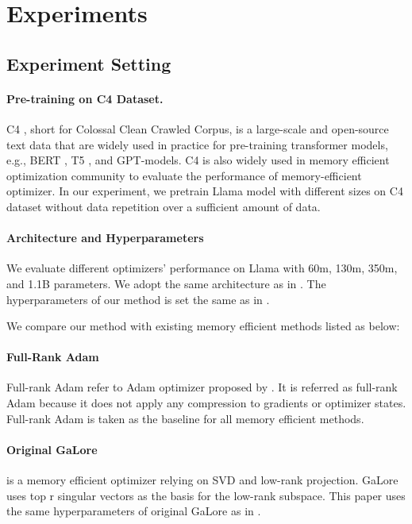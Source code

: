 \section{Experiments}
\subsection{Experiment Setting}
\paragraph{Pre-training on C4 Dataset.}
C4 \cite{raffel2020c4}, short for Colossal Clean Crawled Corpus, is a large-scale and open-source text data that are widely used in practice for pre-training transformer models, e.g., BERT \cite{portes2023mosaicbert}, T5 \cite{xue2020mt5}, and GPT-models. C4 is also widely used in memory efficient optimization community to evaluate the performance of memory-efficient optimizer\cite{hao2024flora, zhao2024galore, zhang2024q-galore, he2024subspace}. In our experiment, we pretrain Llama model with different sizes on C4 dataset without data repetition over a sufficient amount of data\cite{hoffmann2022scalinglaw}. 

\paragraph{Architecture and Hyperparameters} 
We evaluate different optimizers' performance on Llama with 60m, 130m, 350m, and 1.1B parameters. We adopt the same architecture as in \cite{zhao2024galore}. The hyperparameters of our method is set the same as in \cite{zhao2024galore}. 


We compare our method with existing memory efficient methods listed as below:

\paragraph{Full-Rank Adam}
Full-rank Adam refer to Adam optimizer proposed by \cite{kingma2014adam}. It is referred as full-rank Adam because it does not apply any compression to gradients or optimizer states. Full-rank Adam is taken as the baseline for all memory efficient methods.

\paragraph{Original GaLore}
\cite{zhao2024galore} is a memory efficient optimizer relying on SVD and low-rank projection. GaLore uses top r singular vectors as the basis for the low-rank subspace. This paper uses the same hyperparameters of original GaLore as in \cite{zhao2024galore}.



